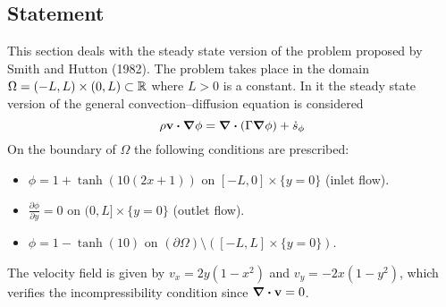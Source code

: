 
\subsection{Statement}

This section deals with the steady state version of the problem proposed by Smith and Hutton (1982). The problem takes place in the domain $\Omega = (-L,L) \times (0,L) \subset \mathbb{R}$ where $L > 0$ is a constant. In it the steady state version of the general convection--diffusion equation is considered
\begin{equation}
	\rho \vb{v} \vdot \grad{\phi} = \div(\Gamma \grad{\phi}) + \dot{s}_\phi
\end{equation}
On the boundary of $\Omega$ the following conditions are prescribed:
\begin{itemize}[topsep=0pt]
	\item $\phi = 1 + \tanh(10(2x+1))$ on $[-L,0] \times \{ y = 0 \}$ (inlet flow).
	\item $\frac{\partial \phi}{\partial y} = 0$ on $(0,L] \times \{ y = 0 \}$ (outlet flow).
	\item $\phi = 1 - \tanh(10)$ on $(\partial \Omega) \setminus ([-L,L] \times \{ y = 0 \})$. 
\end{itemize}
The velocity field is given by $v_x = 2 y (1 - x^2)$ and $v_y = -2 x (1 - y^2)$, which verifies the incompressibility condition since $\div{\vb{v}} = 0$.

